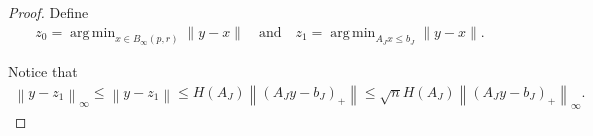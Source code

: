 \documentclass{article}
\theoremstyle{case}
\numberwithin{theorem}{subsection}
\DeclareMathOperator*{\argmin}{arg\,min}
\newcommand{\atr}{A^{\infty}}
\newcommand{\btr}{b^{\infty}}
\newcommand{\Rn}{\mathbb R^n}
\begin{document}
\begin{proof}
Define
\begin{align*}
z_0 = \argmin_{x \in B_{\infty}(p, r)} \|y - x\|
\quad \textrm{and} \quad
z_1 = \argmin_{A_J x \le b_J} \|y - x\|.
\end{align*}


Notice that
\begin{align}
\left\|y - z_1\right\|_{\infty}
\le \left\|y - z_1\right\|
\le H\left(A_J\right) \left\|\left(A_Jy - b_J\right)_+\right\|
\le \sqrt{n} H\left(A_J\right) \left\|\left(A_Jy - b_J\right)_+\right\|_{\infty}.
\label{hoi_computation_1}
\end{align}


% 
% 
% 
% 



\end{proof}
\end{document}
